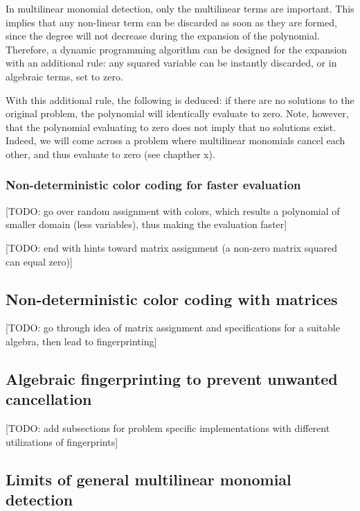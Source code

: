 In multilinear monomial detection, only the multilinear terms are important. This implies that any non-linear term can be discarded 
as soon as they are formed, since the degree will not decrease during the expansion of the polynomial. Therefore, a dynamic 
programming algorithm can be designed for the expansion with an additional rule: any squared variable can be instantly discarded, or 
in algebraic terms, set to zero.\nl

With this additional rule, the following is deduced: if there are no solutions to the original problem, 
the polynomial will identically evaluate to zero. Note, however, that the polynomial 
evaluating to zero does not imply that no solutions exist. Indeed, we will come across a problem where 
multilinear monomials cancel each other, and thus evaluate to zero (see chapther x).

\subsubsection{Non-deterministic color coding for faster evaluation}

[TODO: go over random assignment with colors, 
which results a polynomial of smaller domain (less variables), thus 
making the evaluation faster]

[TODO: end with hints toward matrix assignment (a non-zero matrix squared can equal zero)]

\subsection{Non-deterministic color coding with matrices}

[TODO: go through idea of matrix assignment and specifications for a suitable algebra, 
then lead to fingerprinting]

\subsection{Algebraic fingerprinting to prevent unwanted cancellation}



[TODO: add subsections for problem specific implementations with different utilizations of fingerprints]

\subsection{Limits of general multilinear monomial detection}

